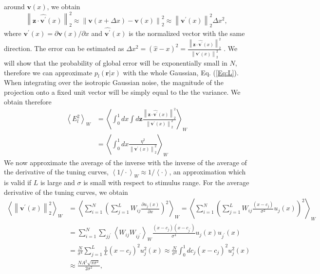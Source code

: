 \documentclass[a4paper]{article}%
\begin{document}
around $\mathbf{v}(x)$, we obtain
\begin{equation}
\left\|  \mathbf{z}\cdot\hat{\mathbf{v^{\prime}}}(x)\right\|  _{2}^{2}
\approx\left\|  \mathbf{v}(x+\Delta x)-\mathbf{v}(x)\right\|  _{2}^{2}
\approx\left\|  \mathbf{v^{\prime}}(x)\right\|  _{2}^{2}\Delta x^{2},
\label{Eq:lin-exp}%
\end{equation}
where $\mathbf{v^{\prime}}(x) = \partial\mathbf{v}(x)/\partial x$ and
$\hat{\mathbf{v^{\prime}}}(x)$ is the normalized vector with the same
direction. The error can be estimated as $\Delta x^{2} = \left(  \hat
{x}-x\right)  ^{2} = \frac{\left\|  \mathbf{z}\cdot\hat{\mathbf{v^{\prime}}%
}(x)\right\|  _{2}^{2}}{\left\|  \mathbf{v^{\prime} }(x)\right\|  _{2}^{2}}$ .
We will show that the probability of global error will be exponentially small
in $N$, therefore we can approximate $p_{l} (\mathbf{r}|x)$ with the whole
Gaussian, Eq. (\ref{Eq:L}). When integrating over the isotropic Gaussian
noise, the magnitude of the projection onto a fixed unit vector will be simply
equal to the the variance. We obtain therefore
\begin{equation}
\begin{split}
\left\langle E_{l}^{2}\right\rangle _{W}  &  = \left\langle \int_0^1 dx \int
d\mathbf{z} \frac{ \left\|  \mathbf{z}\cdot\hat{\mathbf{v^{\prime}}
}(x)\right\|  _{2}^{2} }{\left\|  \mathbf{v^{\prime}}(x)\right\|  _{2}^{2}
}\right\rangle _{W}\\
&  =\left\langle \int_0^1 dx \frac{\eta^{2} }{\left\|  \mathbf{v^{\prime}
}(x)\right\|  _{2}^{2}}\right\rangle _{W}
\end{split}
\end{equation}
We now approximate the average of the inverse with the inverse of the average
of the derivative of the tuning curves, $\left\langle 1 / \cdot\right\rangle
_{W} \approx1/ \left\langle \cdot\right\rangle $, an approximation which is
valid if $L$ is large and $\sigma$ is small with respect to stimulus range.
For the average derivative of the tuning curves, we obtain
\begin{equation}
\begin{split}
\left\langle \left\|  \mathbf{v^{\prime}}(x)\right\|  _{2}^{2}\right\rangle
_{W}  &  = \left\langle \sum_{i=1}^N \left(  \sum_{j=1}^{L} W_{ij} \frac{\partial u_{j}%
(x)}{\partial x}\right)  ^{2} \right\rangle _{W} = \left\langle \sum_{i=1}^N\left(
\sum_{j=1}^{L} W_{ij} \frac{\left(  x-c_{j}\right)  }{\sigma^{2}}u_{j}(x)
\right)  ^{2}\right\rangle _{W}\\
&  = \sum_{i=1}^{N} \sum_{jj^{\prime}} \left\langle W_{ij}W_{ij^{\prime}%
}\right\rangle _{W} \frac{(x-c_{j})(x-c_{j^{\prime}} )}{\sigma^{4}} u_{j}(x)
u_{j^{\prime}}(x)\\
&  = \frac{N }{\sigma^{4}} \sum_{j=1}^{L}\frac{1}{L} \left(  x-c_{j}\right)
^{2} u_{j}^{2}(x) \approx\frac{N }{\sigma^{4}} \int_{0}^{1} dc_{j} \left(
x-c_{j}\right)  ^{2} u_{j}^{2}(x)\\
&  \approx\frac{NA^{2} \sqrt{\pi\sigma^{2}}}{2\sigma^{2}},
\end{split}
\label{Eq:tcd}%
\end{equation}
\end{document}
